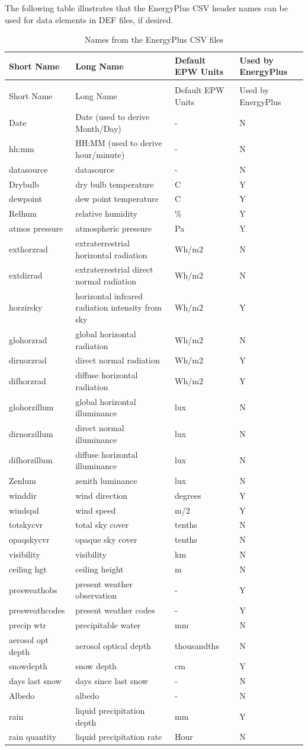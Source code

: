 The following table illustrates that the EnergyPlus CSV header names can be used for data elements in DEF files, if desired.

\begin{longtable}[c]{p{1.5in}p{1.5in}p{1.5in}p{1.5in}}
\caption{Names from the EnergyPlus CSV files \label{table:names-from-the-energyplus-csv-files}} \tabularnewline
\toprule 
Short Name & Long Name & Default EPW Units & Used by EnergyPlus \tabularnewline
\midrule
\endfirsthead

\caption[]{Names from the EnergyPlus CSV files} \tabularnewline
\toprule 
Short Name & Long Name & Default EPW Units & Used by EnergyPlus \tabularnewline
\midrule
\endhead

Date & Date (used to derive Month/Day) & - & N \tabularnewline
hh:mm & HH:MM (used to derive hour/minute) & - & N \tabularnewline
datasource & datasource & - & N \tabularnewline
Drybulb & dry bulb temperature & C & Y \tabularnewline
dewpoint & dew point temperature & C & Y \tabularnewline
Relhum & relative humidity & \% & Y \tabularnewline
atmos pressure & atmospheric pressure & Pa & Y \tabularnewline
exthorzrad & extraterrestrial horizontal radiation & Wh/m2 & N \tabularnewline
extdirrad & extraterrestrial direct normal radiation & Wh/m2 & N \tabularnewline
horzirsky & horizontal infrared radiation intensity from sky & Wh/m2 & Y \tabularnewline
glohorzrad & global horizontal radiation & Wh/m2 & N \tabularnewline
dirnorzrad & direct normal radiation & Wh/m2 & Y \tabularnewline
difhorzrad & diffuse horizontal radiation & Wh/m2 & Y \tabularnewline
glohorzillum & global horizontal illuminance & lux & N \tabularnewline
dirnorzillum & direct normal illuminance & lux & N \tabularnewline
difhorzillum & diffuse horizontal illuminance & lux & N \tabularnewline
Zenlum & zenith luminance & lux & N \tabularnewline
winddir & wind direction & degrees & Y \tabularnewline
windspd & wind speed & m/2 & Y \tabularnewline
totskycvr & total sky cover & tenths & N \tabularnewline
opaqskycvr & opaque sky cover & tenths & N \tabularnewline
visibility & visibility & km & N \tabularnewline
ceiling hgt & ceiling height & m & N \tabularnewline
presweathobs & present weather observation & - & Y \tabularnewline
presweathcodes & present weather codes & - & Y \tabularnewline
precip wtr & precipitable water & mm & N \tabularnewline
aerosol opt depth & aerosol optical depth & thousandths & N \tabularnewline
snowdepth & snow depth & cm & Y \tabularnewline
days last snow & days since last snow & - & N \tabularnewline
Albedo & albedo & - & N \tabularnewline
rain & liquid precipitation depth & mm & Y \tabularnewline
rain quantity & liquid precipitation rate & Hour & N \tabularnewline
\bottomrule
\end{longtable}

